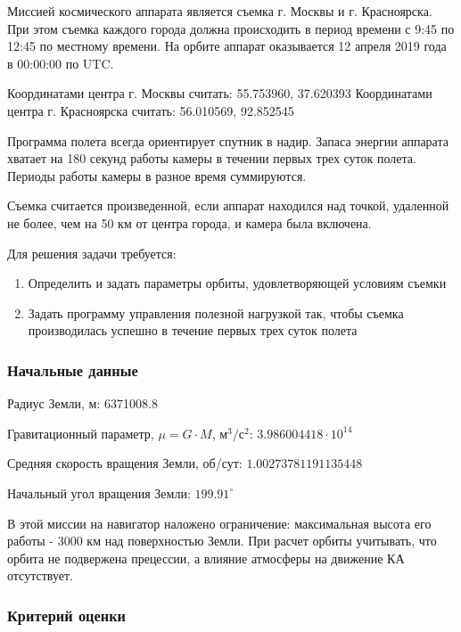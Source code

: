 
Миссией космического аппарата является съемка г. Москвы и г. Красноярска. При этом съемка каждого города должна происходить в период времени с 9:45 по 12:45 по местному времени. На орбите аппарат оказывается 12 апреля 2019 года в 00:00:00 по UTC.

Координатами центра г. Москвы считать: 55.753960,  37.620393
Координатами центра г. Красноярска считать: 56.010569, 92.852545

Программа полета всегда ориентирует спутник в надир. Запаса энергии аппарата хватает на 180 секунд работы камеры в течении первых трех суток полета. Периоды работы камеры в разное время суммируются.

Съемка считается произведенной, если аппарат находился над точкой, удаленной не более, чем на 50 км от центра города, и камера была включена.

Для решения задачи требуется:


\begin{enumerate}
    \item Определить и задать параметры орбиты, удовлетворяющей условиям съемки
    \item Задать программу управления полезной нагрузкой так, чтобы съемка производилась успешно в течение первых трех суток полета    
\end{enumerate}

\subsubsection*{Начальные данные}

Радиус Земли, м: 6371008.8

Гравитационный параметр, $\mu = G \cdot M$, м$^3/$с$^2$: $3.986004418 \cdot 10^{14}$

Средняя скорость вращения Земли, об/сут: $1.00273781191135448$

Начальный угол вращения Земли: $199.91^{\circ}$


В этой миссии на навигатор наложено ограничение: максимальная высота его работы - 3000 км над поверхностью Земли. При расчет орбиты учитывать, что орбита не подвержена прецессии, а влияние атмосферы на движение КА отсутствует.

\subsubsection*{Критерий оценки}

